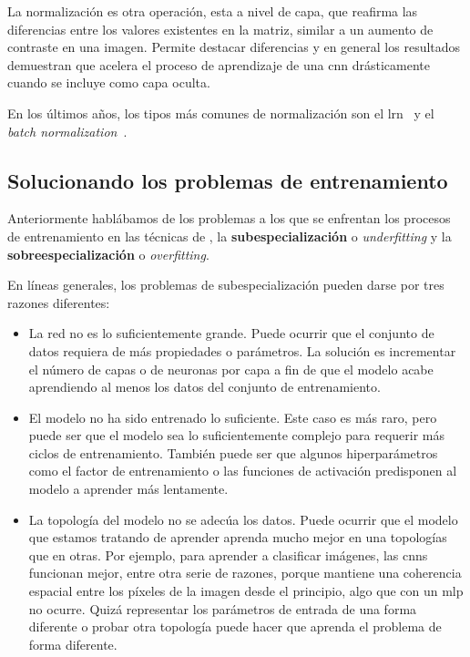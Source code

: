 La normalización es otra operación, esta a nivel de capa, que reafirma las diferencias entre los valores existentes en la matriz, similar a un aumento de contraste en una imagen. Permite destacar diferencias y en general los resultados demuestran que acelera el proceso de aprendizaje de una \ac{cnn} drásticamente cuando se incluye como capa oculta.

En los últimos años, los tipos más comunes de normalización son el \gls{lrn}~\cite{robinson2007explaining} y el \textit{batch normalization}~\cite{ioffe2015batch}.

\subsection{Solucionando los problemas de entrenamiento}

Anteriormente hablábamos de los problemas a los que se enfrentan los procesos de entrenamiento en las técnicas de , la \textbf{subespecialización} o \textit{underfitting} y la \textbf{sobreespecialización} o \textit{overfitting}.

En líneas generales, los problemas de subespecialización pueden darse por tres razones diferentes:

\begin{itemize}
	\item La red no es lo suficientemente grande. Puede ocurrir que el conjunto de datos requiera de más propiedades o parámetros. La solución es incrementar el número de capas o de neuronas por capa a fin de que el modelo acabe aprendiendo al menos los datos del conjunto de entrenamiento.
	\item El modelo no ha sido entrenado lo suficiente. Este caso es más raro, pero puede ser que el modelo sea lo suficientemente complejo para requerir más ciclos de entrenamiento. También puede ser que algunos hiperparámetros como el factor de entrenamiento o las funciones de activación predisponen al modelo a aprender más lentamente.
	\item La topología del modelo no se adecúa los datos. Puede ocurrir que el modelo que estamos tratando de aprender aprenda mucho mejor en una topologías que en otras. Por ejemplo, para aprender a clasificar imágenes, las \glspl{cnn} funcionan mejor, entre otra serie de razones, porque mantiene una coherencia espacial entre los píxeles de la imagen desde el principio, algo que con un \gls{mlp} no ocurre. Quizá representar los parámetros de entrada de una forma diferente o probar otra topología puede hacer que aprenda el problema de forma diferente.
\end{itemize}

